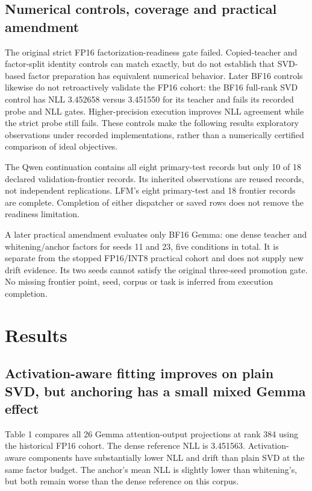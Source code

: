 \documentclass[10pt]{article}
\begin{document}
\subsection{Numerical controls, coverage and practical amendment}

The original strict FP16 factorization-readiness gate failed. Copied-teacher and factor-split identity controls can match exactly, but do not establish that SVD-based factor preparation has equivalent numerical behavior. Later BF16 controls likewise do not retroactively validate the FP16 cohort: the BF16 full-rank SVD control has NLL 3.452658 versus 3.451550 for its teacher and fails its recorded probe and NLL gates. Higher-precision execution improves NLL agreement while the strict probe still fails. These controls make the following results exploratory observations under recorded implementations, rather than a numerically certified comparison of ideal objectives.

The Qwen continuation contains all eight primary-test records but only 10 of 18 declared validation-frontier records. Its inherited observations are reused records, not independent replications. LFM's eight primary-test and 18 frontier records are complete. Completion of either dispatcher or saved rows does not remove the readiness limitation.

A later practical amendment evaluates only BF16 Gemma: one dense teacher and whitening/anchor factors for seeds 11 and 23, five conditions in total. It is separate from the stopped FP16/INT8 practical cohort and does not supply new drift evidence. Its two seeds cannot satisfy the original three-seed promotion gate. No missing frontier point, seed, corpus or task is inferred from execution completion.

\section{Results}

\subsection{Activation-aware fitting improves on plain SVD, but anchoring has a small mixed Gemma effect}

Table 1 compares all 26 Gemma attention-output projections at rank 384 using the historical FP16 cohort. The dense reference NLL is 3.451563. Activation-aware components have substantially lower NLL and drift than plain SVD at the same factor budget. The anchor's mean NLL is slightly lower than whitening's, but both remain worse than the dense reference on this corpus.
\end{document}
